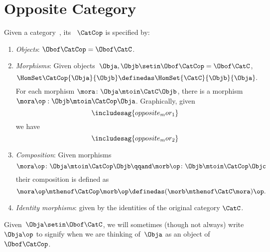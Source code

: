 
\section{Opposite Category}

\begin{ctdefinition}
    \label{def:opposite-category}
    \label{def:oppositecat}
    Given a category~\CatC, its ~$\CatCop$ is specified by:
    \begin{enumerate}
        \item \emph{Objects}: $\Obof\CatCop = \Obof\CatC$.

        \item \emph{Morphisms}: Given objects~$\Obja,  \Objb \setin \Obof\CatCop = \Obof\CatC$,
              \begin{equation}\label{eq:homset-op-cat}
                  \HomSet\CatCop{\Obja}{\Objb} \definedas \HomSet{\CatC}{\Objb}{\Obja}.
              \end{equation}
              For each morphism $\mora\colon\Obja\mtoin\CatC\Objb$, there is a morphism
              $\mora\op:\Objb\mtoin\CatCop\Obja$.
              Graphically, given
              \begin{equation}\label{eq:opposite_mor_1}
                  \includesag{opposite_mor_1}
              \end{equation}
              we have
              \begin{equation}
                  \label{eq:opposite_mor_2}
                  \includesag{opposite_mor_2}
              \end{equation}
        \item \emph{Composition}: Given morphisms
              \begin{equation}
                  \mora\op\colon \Obja \mtoin\CatCop \Objb
                  \qqand
                  \morb\op\colon \Objb \mtoin\CatCop \Objc
              \end{equation}
              their composition is defined as
              \begin{equation}
                  \mora\op \mthenof\CatCop \morb\op \definedas (\morb \mthenof\CatC \mora)\op.
              \end{equation}
        \item \emph{Identity morphisms}: given by the identities of the original category $\CatC$.
    \end{enumerate}
\end{ctdefinition}
Given~$\Obja \setin  \Obof\CatC$, we will sometimes (though not always) write $\Obja\op$ to signify when we are thinking of~$\Obja$ as an object of~$\Obof\CatCop$.


